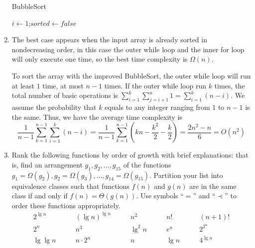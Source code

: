 \documentclass[12pt,a4paper]{article}
\makeatletter
\newtheorem*{solution}{Solution}
\theoremstyle{definition}
\renewenvironment{solution}[1][Solution] {\par\pushQED{\qed}\normalfont\topsep6\p@\@plus6\p@\relax\trivlist\item[\hskip\labelsep\bfseries#1\@addpunct{.}]\ignorespaces}{\popQED\endtrivlist\@endpefalse} \makeatother
\makeatother
\begin{document}
\begin{enumerate}
    \begin{minipage}[t]{0.8\textwidth}
    \begin{algorithm}[H]

        \BlankLine
        \caption{BubbleSort}\label{Alg_Bubble}

        $i\leftarrow 1$;$sorted\leftarrow false$\;

    \end{algorithm}
    \end{minipage}

    \begin{solution}
        The best case appears when the input array is already sorted in nondecreasing order, in this case the outer while loop and the inner for loop will only execute one time, so the best time complexity is $\Omega(n)$.
        
        To sort the array with the improved BubbleSort, the outer while loop will run at least $1$ time, at most $n-1$ times. If the outer while loop run $k$ times, the total number of basic operations is $\sum_{i=1}^{k}\sum_{j=i+1}^{n}1 = \sum_{i=1}^{k}(n-i)$. We assume the probability that $k$ equals to any integer ranging from $1$ to $n-1$ is the same. Thus, we have the average time complexity is $$\frac{1}{n-1}\sum_{k=1}^{n-1}\sum_{i=1}^{k}(n-i) = \frac{1}{n-1}\sum_{k=1}^{n-1}(kn-\frac{k^{2}}{2}-\frac{k}{2}) = \frac{2n^{2}-n}{6} = O(n^{2})$$
    \end{solution}

    \item

    Rank the following functions by order of growth with brief explanations: that is, find an arrangement $g_1, g_2, \ldots , g_{15}$ of the functions $g_1 = \Omega(g_2), g_2 = \Omega(g_3), \ldots, g_{14} = \Omega(g_{15})$.  Partition your list into equivalence classes such that functions $f(n)$ and $g(n)$ are in the same class if and only if $f(n) = \Theta(g(n))$. Use symbols ``$=$'' and ``$\prec$'' to order these functions appropriately.
    $$
    \begin{array}{ccccc}
        2^{\lg n} \quad & \quad (\lg n)^{\lg n} \quad & \quad n^2 \quad & \quad n! \quad & \quad (n + 1)! \\
        2^n \quad & \quad n^3 \quad & \quad \lg^2 n \quad & \quad e^n \quad & \quad 2^{2^n} \\
        \lg\lg n \quad & \quad n\cdot 2^n \quad & \quad n \quad & \quad \lg n \quad & \quad 4^{\lg n} \\
    \end{array}
    $$


\end{enumerate}
\end{document}
